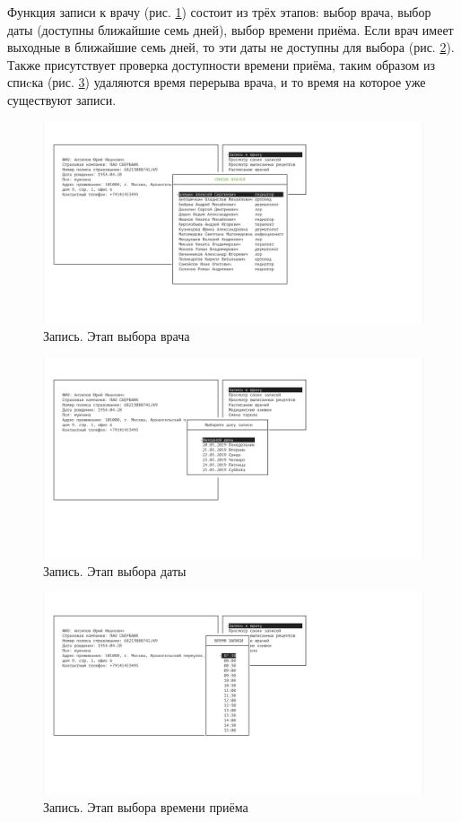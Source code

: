 \documentclass[14pt,a4paper,russian]{extreport}
\begin{document}
Функция записи к врачу (рис. \ref{fig:appointment1}) состоит из трёх этапов: выбор врача, выбор даты (доступны ближайшие семь дней), выбор времени приёма.
Если врач имеет выходные в ближайшие семь дней, то эти даты не доступны для выбора (рис. \ref{fig:appointment2}). Также присутствует проверка доступности времени приёма, таким образом из спиcка (рис. \ref{fig:appointment3}) удаляются время перерыва врача, и то время на которое уже существуют записи.\par
\begin{figure}[h!]
        \includegraphics[width=\textwidth]{prog_int/appointment1}
        \caption{Запись. Этап выбора врача}
        \label{fig:appointment1}
\end{figure}
\begin{figure}[h!]
        \includegraphics[width=\textwidth]{prog_int/appointment2}
        \caption{Запись. Этап выбора даты}
        \label{fig:appointment2}
\end{figure}
\begin{figure}[h!]
        \includegraphics[width=\textwidth]{prog_int/appointment3}
        \caption{Запись. Этап выбора времени приёма}
        \label{fig:appointment3}
\end{figure}
\end{document}
